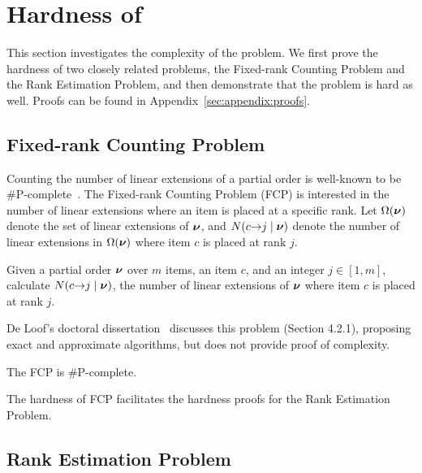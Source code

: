 \section{Hardness of \esc}
\label{sec:complexity}

This section investigates the complexity of the \esc problem. We first prove the hardness of two closely related problems, the Fixed-rank Counting Problem and the Rank Estimation Problem, and then demonstrate that the \esc problem is hard as well. Proofs can be found in Appendix~\ref{sec:appendix:proofs}.

\subsection{Fixed-rank Counting Problem}

Counting the number of linear extensions of a partial order is well-known to be \#P-complete~\cite{DBLP:conf/stoc/BrightwellW91}.
The Fixed-rank Counting Problem (FCP) is interested in the number of linear extensions where an item is placed at a specific rank.
Let $\Omega(\bm{\nu})$ denote the set of linear extensions of $\bm{\nu}$, and $N(c {\rightarrow} j \mid \bm{\nu})$ denote the number of linear extensions in $\Omega(\bm{\nu})$ where item $c$ is placed at rank $j$.

\begin{definition}[FCP]
    Given a partial order $\bm{\nu}$ over $m$ items, an item $c$, and an integer $j \in [1, m]$, calculate $N(c {\rightarrow} j \mid \bm{\nu})$, the number of linear extensions of $\bm{\nu}$ where item $c$ is placed at rank $j$.
\end{definition}

De Loof's doctoral dissertation~\cite{Loof2009EfficientCO} discusses this problem (Section 4.2.1), proposing exact and approximate algorithms, but does not provide proof of complexity.

\def\theoremFCPhardnessOverPartialOrders{
    The FCP is \#P-complete.
}

\begin{theorem} \label{theorem:FCP_shaPcomplete_over_partialOrders}
    \theoremFCPhardnessOverPartialOrders
\end{theorem}

The hardness of FCP facilitates the hardness proofs for the Rank Estimation Problem.

\subsection{Rank Estimation Problem}

